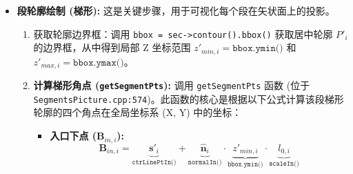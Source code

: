 \documentclass{ctexart}
\begin{document}
\begin{itemize}
\begin{itemize}
\begin{itemize}
                    \paragraph{代码对应 (曲线出口点):} (位于 \texttt{Acoustic3dSimulation.cpp} 约 4132-4144 行，简化逻辑)
                    \begin{lstlisting}[language=C++]
else // Curved case
{
  theta = abs(circleArcAngle) / 2.;
  // 根据曲率半径和角度符号确定旋转方向
  if (/* condition based on signs of R and alpha */)
  {
    // 计算旋转变换 rotate1 (e.g., M_PI/2 - theta)
    // 计算平移变换 translate1 (基于 -2*R*sin(theta) 和 rotate1(-N))
    return(translate1(Pt));
  }
  else
  {
    // 计算旋转变换 rotate2 (e.g., theta - M_PI/2)
    // 计算平移变换 translate2 (基于 2*R*sin(theta) 和 rotate2(N))
    return(translate2(Pt));
  }
}
                    \end{lstlisting}
                    (其中 \(\mathbf{C}\) 是该段的曲率中心，\(\mathbf{R}(\alpha_i)\) 代表将二维向量（在此例中是从曲率中心指向入口点的向量 \({\mathbf{s}'}_i - \mathbf{C}\)）逆时针旋转曲率角度 \(\alpha_i\) 的旋转矩阵)。
                    \textbf{说明:} %
                \end{itemize}
            \item 绘制线段：在计算得到的入口点 \({\mathbf{s}'}_i\) 和出口点 \(\mathbf{s}_{out,i}\) 之间绘制线段（通常为红色）。
        \end{itemize}
    \item \textbf{段轮廓绘制 (梯形):} 这是关键步骤，用于可视化每个段在矢状面上的投影。
        \begin{enumerate}
            \item 获取轮廓边界框：调用 \texttt{bbox = sec->contour().bbox()} 获取居中轮廓 \(P'_i\) 的边界框，从中得到局部 Z 坐标范围 \(z'_{min,i} = \texttt{bbox.ymin()}\) 和 \(z'_{max,i} = \texttt{bbox.ymax()}\)。
            \item \textbf{计算梯形角点 (\texttt{getSegmentPts}):} 调用 \texttt{getSegmentPts} 函数 (位于 \texttt{SegmentsPicture.cpp:574})。此函数的核心是根据以下公式计算该段梯形轮廓的四个角点在全局坐标系 (X, Y) 中的坐标：
                \begin{itemize}
                    \item \textbf{入口下点 (\( \mathbf{B}_{in,i} \)):}
                    \[ \mathbf{B}_{in,i} = \underbrace{{\mathbf{s}'}_i}_{\texttt{ctrLinePtIn()}} + \underbrace{\hat{\mathbf{n}}_i}_{\texttt{normalIn()}} \cdot \underbrace{z'_{min,i}}_{\texttt{bbox.ymin()}} \cdot \underbrace{l_{0,i}}_{\texttt{scaleIn()}} \]

\end{itemize}
\end{enumerate}
\end{itemize}
\end{document}
